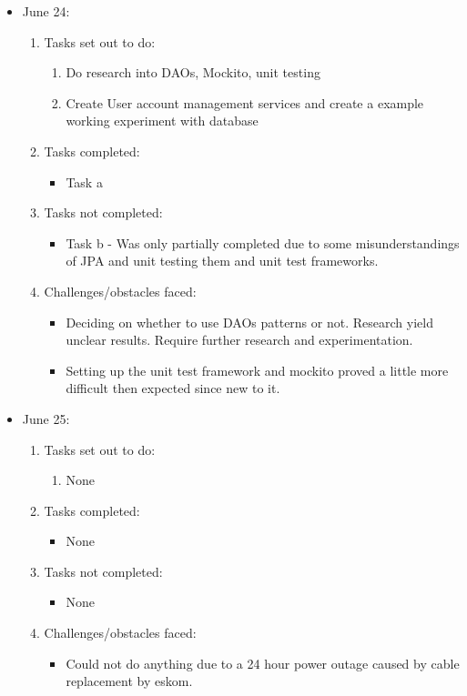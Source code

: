 \documentclass[12pt]{article}
\begin{document}
	\begin{itemize}
		\item June 24:
		\begin{enumerate}
			\item Tasks set out to do:
			\begin{enumerate}
				\item Do research into DAOs, Mockito, unit testing
				\item Create User account management services and create a example working experiment with database				
			\end{enumerate}
			\item Tasks completed:
			\begin{itemize}
				\item Task a
			\end{itemize}
			\item Tasks not completed:
			\begin{itemize}
				\item Task b - Was only partially completed due to some misunderstandings of JPA and unit testing them and unit test frameworks.
			\end{itemize}
			\item Challenges/obstacles faced:
			\begin{itemize}
				\item Deciding on whether to use DAOs patterns or not. Research yield unclear results. Require further research and experimentation.
				\item Setting up the unit test framework and mockito proved a little more difficult then expected since new to it.				
			\end{itemize}			
		\end{enumerate}
	\end{itemize}
	
	\begin{itemize}
		\item June 25:
		\begin{enumerate}
			\item Tasks set out to do:
			\begin{enumerate}
				\item None
			\end{enumerate}
			\item Tasks completed:
			\begin{itemize}
				\item None
			\end{itemize}
			\item Tasks not completed:
			\begin{itemize}
				\item None
			\end{itemize}
			\item Challenges/obstacles faced:
			\begin{itemize}
				\item Could not do anything due to a 24 hour power outage caused by cable replacement by eskom.
			\end{itemize}			
		\end{enumerate}
	\end{itemize}
	
\end{document}
